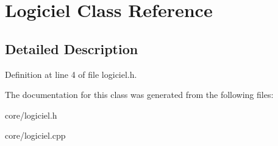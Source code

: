 \hypertarget{class_logiciel}{
\section{Logiciel Class Reference}
\label{class_logiciel}
}


\subsection{Detailed Description}


Definition at line 4 of file logiciel.h.



The documentation for this class was generated from the following files:\begin{DoxyCompactItemize}
\item 
core/logiciel.h\item 
core/logiciel.cpp\end{DoxyCompactItemize}
